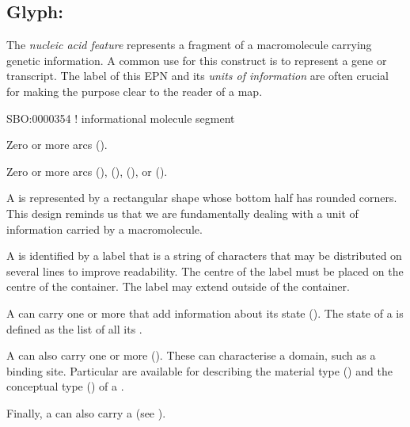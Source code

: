 \subsection{Glyph: }
\label{sec:genetic}

The \emph{nucleic acid feature} represents a fragment of a macromolecule carrying genetic information.
A common use for this construct is to represent a gene or transcript.
The label of this EPN and its \emph{units of information} are often crucial for making the purpose clear to the reader of a map.

\begin{glyphDescription}

\glyphSboTerm
SBO:0000354 ! informational molecule segment

\glyphIncoming
Zero or more  arcs ().

\glyphOutgoing
Zero or more  arcs (),  (),  (), or  ().

\glyphContainer
A  is represented by a rectangular shape whose bottom half has rounded corners.
This design reminds us that we are fundamentally dealing with a unit of information carried by a macromolecule.

\glyphLabel
A  is identified by a label that is  a string of characters that may be distributed on several lines to improve readability.
The centre of the label must be placed on the centre of the container.
The label may extend outside of the container.

\glyphAux
A  can carry one or more  that add information about its state ().
The state of a  is defined as the list of all its .

A  can also carry one or more  ().
These can characterise a domain, such as a binding site.
Particular  are available for describing the material type () and the conceptual type () of a .

Finally, a  can also carry a  (see ).

\end{glyphDescription}

